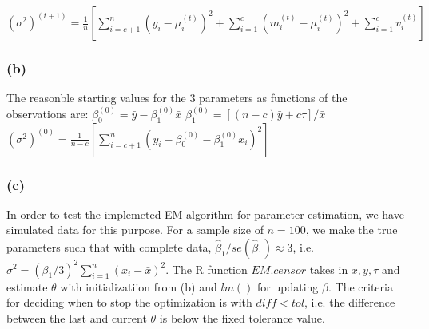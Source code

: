 \documentclass{article}
\begin{document}
$\displaystyle (\sigma^2)^{(t+1)} =
\frac{1}{n}[\sum_{i=c+1}^n(y_i-\mu_i^{(t)})^2 + \sum_{i=1}^c(m_i^{(t)}-\mu_i^{(t)})^2 + \sum_{i=1}^cv_i^{(t)}]$

\subsubsection*{(b)}
\hspace{12 pt} The reasonble starting values for the 3 parameters as functions of the observations are:\newline
$\displaystyle \beta_0^{(0)} = \bar y - \beta_1^{(0)}\bar x$\newline
$\displaystyle \beta_1^{(0)} = [(n-c)\bar y + c\tau]/{\bar x}$\newline
$\displaystyle (\sigma^2)^{(0)} = \frac{1}{n-c}[\sum_{i=c+1}^n(y_i-\beta_0^{(0)}-\beta_1^{(0)}x_i)^2]$\newline

\subsubsection*{(c)}
\hspace{12 pt} In order to test the implemeted EM algorithm for parameter estimation, we have simulated data for this purpose. For a sample size of $n=100$,
we make the true parameters such that with complete data, $\hat\beta_1/se(\hat\beta_1)\approx3$, 
i.e. $\sigma^2 = (\beta_1/3)^2\sum_{i=1}^n(x_i-\bar x)^2$. The R function $EM.censor$ takes in $x,y,\tau$ and estimate $\theta$ with initializatiion
from (b) and $lm()$ for updating $\beta$. The criteria for deciding when to stop the optimization is with $diff < tol$, i.e. the difference between
the last and current $\theta$ is below the fixed tolerance value.
\end{document}

